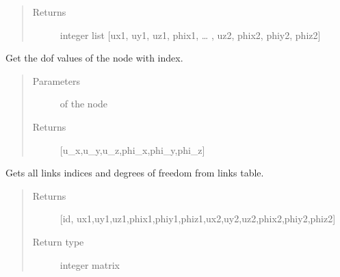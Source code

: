 \documentclass[letterpaper,10pt,english]{sphinxmanual}
\begin{document}
\begin{fulllineitems}
\begin{fulllineitems}
\begin{quote}
\begin{description}
\begin{itemize}
\end{itemize}

\item[{Returns}] \leavevmode
integer list {[}ux1, uy1, uz1, phix1, … , uz2, phix2, phiy2, phiz2{]}

\end{description}\end{quote}

\end{fulllineitems}


\begin{fulllineitems}
\label{\detokenize{api:beamon.database.Database.get_dof}}
Get the dof values of the node with index.
\begin{quote}\begin{description}
\item[{Parameters}] \leavevmode
{} \textendash{} of the node

\item[{Returns}] \leavevmode
{[}u\_x,u\_y,u\_z,phi\_x,phi\_y,phi\_z{]}

\end{description}\end{quote}

\end{fulllineitems}


\begin{fulllineitems}
\label{\detokenize{api:beamon.database.Database.get_edof}}
Gets all links indices and degrees of freedom from links table.
\begin{quote}\begin{description}
\item[{Returns}] \leavevmode
{[}id, ux1,uy1,uz1,phix1,phiy1,phiz1,ux2,uy2,uz2,phix2,phiy2,phiz2{]}

\item[{Return type}] \leavevmode
integer matrix

\end{description}\end{quote}


\end{fulllineitems}
\end{fulllineitems}
\end{document}
